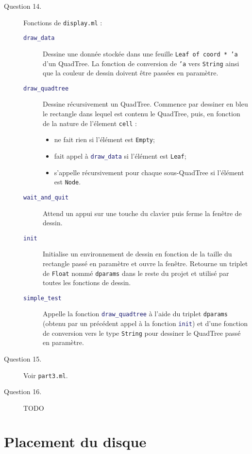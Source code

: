 \documentclass[11pt]{scrartcl}
\newcommand{\functionname}[1]{\texttt{\textcolor{MidnightBlue}{#1}}}
\newcommand{\filename}[1]{\texttt{\textcolor{RawSienna}{#1}}}
\newcommand{\code}[1]{\texttt{#1}}
\begin{document}
\begin{description}
\item[Question 14.] Fonctions de \filename{display.ml} :
\begin{description}
\item[\functionname{draw_data}] Dessine une donnée stockée dans une feuille \code{Leaf of coord * 'a} d'un QuadTree. La fonction de conversion de \code{'a} vers \code{String} ainsi que la couleur de dessin doivent être passées en paramètre.
\item[\functionname{draw_quadtree}] Dessine récursivement un QuadTree. Commence par dessiner en bleu le rectangle dans lequel est contenu le QuadTree, puis, en fonction de la nature de l'élement \code{cell} :
\begin{itemize}
\item ne fait rien si l'élément est \code{Empty};
\item fait appel à \functionname{draw_data} si l'élément est \code{Leaf};
\item s'appelle récursivement pour chaque sous-QuadTree si l'élément est \code{Node}.
\end{itemize}
\item[\functionname{wait_and_quit}] Attend un appui sur une touche du clavier puis ferme la fenêtre de dessin.
\item[\functionname{init}] Initialise un environnement de dessin en fonction de la taille du rectangle passé en paramètre et ouvre la fenêtre. Retourne un triplet de \code{Float} nommé \code{dparams} dans le reste du projet et utilisé par toutes les fonctions de dessin. 
\item[\functionname{simple_test}] Appelle la fonction \functionname{draw_quadtree} à l'aide du triplet \code{dparams} (obtenu par un précédent appel à la fonction \functionname{init}) et d'une fonction de conversion vers le type \code{String} pour dessiner le QuadTree passé en paramètre.
\end{description}

\item[Question 15.] Voir \filename{part3.ml}.

\item[Question 16.] TODO
\end{description}

\section{Placement du disque}
\end{document}
